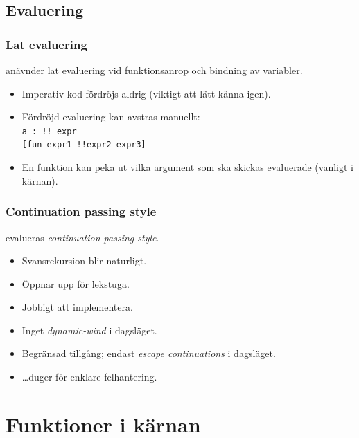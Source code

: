 \documentclass[noamsthm,handout]{beamer}
\begin{document}
\subsection{Evaluering}
\begin{frame}\frametitle{Lat evaluering}
  \Shapes anävnder lat evaluering vid funktionsanrop och bindning av variabler.

  \begin{itemize}
  \item Imperativ kod fördröjs aldrig (viktigt att lätt känna igen).
  \item Fördröjd evaluering kan avstras manuellt:\\
    \texttt{a : {\color{red}!!} expr}\\
    \texttt{[fun expr1 {\color{red}!!}expr2 expr3]}
  \item En funktion kan peka ut vilka argument som ska skickas evaluerade (vanligt i kärnan).
  \end{itemize}

\end{frame}
\begin{frame}\frametitle{Continuation passing style}
  \Shapes evalueras \emph{continuation passing style}.
  \begin{itemize}
  \item Svansrekursion blir naturligt.
  \item Öppnar upp för lekstuga.
  \item Jobbigt att implementera.
  \item Inget \emph{dynamic-wind} i dagsläget.
  \item Begränsad tillgång; endast \emph{escape continuations} i dagsläget.
  \item \ldots duger för enklare felhantering.
  \end{itemize}
\end{frame}


\section{Funktioner i kärnan}
\end{document}
